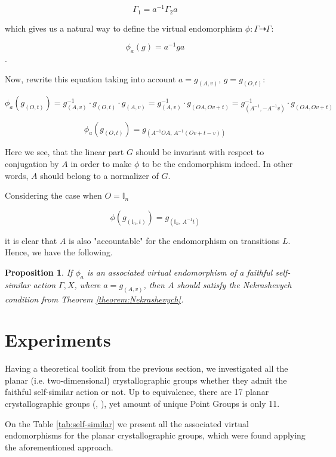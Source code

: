 \documentclass[a4paper,12pt]{amsart}
\newtheorem{proposition}{Proposition}
\begin{document}
	$$\Gamma_1 = a^{-1} \Gamma_2 a$$
	
	which gives us a natural way to define the virtual endomorphism $\phi : \Gamma \dashrightarrow \Gamma$: 
	
	$$\phi_a(g) = a^{-1} g a$$.
	
	Now, rewrite this equation taking into account $a = g_{(A, v)}, \, g = g_{(O, t)}$:
	
	$$\phi_a (g_{(O, t)}) = g^{-1}_{(A, v)} \cdot g_{(O, t)} \cdot g_{(A, v)} = g^{-1}_{(A, v)} \cdot g_{(OA, Ov + t)} = g^{-1}_{(A^{-1}, -A^{-1}v)} \cdot g_{(OA, Ov + t)} $$
	
	\begin{equation}
		\label{eq:eq1}
		\phi_a (g_{(O, t)}) = g_{(A^{-1}OA, \, A^{-1}(Ov + t - v))}
	\end{equation}
	
	Here we see, that the linear part $G$ should be invariant with respect to conjugation by $A$ in order to make $\phi$ to be the endomorphism indeed. In other words, $A$ should belong to a normalizer of $G$.
	
	Considering the case when $O = \mathbb{I}_n$
	
	\begin{equation}
		\label{eq:eq1}
		\phi (g_{(\mathbb{I}_n, t)}) = g_{(\mathbb{I}_n, \, A^{-1}t)}
	\end{equation}
		
	
	it is clear that $A$ is also "accountable" for the endomorphism on transitions $L$. Hence, we have the following.
	
	\begin{proposition}
		If $\phi_{a}$ is an associated virtual endomorphism of a faithful self-similar action $\Gamma, X$, where $a = g_{(A, v)}$, then $A$ should satisfy the Nekrashevych condition from Theorem \ref{theorem:Nekrashevych}.
	\end{proposition}
	
	
	\newpage 
	\section{Experiments}
	Having a theoretical toolkit from the previous section, we investigated all the planar (i.e. two-dimensional) crystallographic groups whether they admit the faithful self-similar action or not. Up to equivalence, there are 17 planar crystallographic groups (\cite{Fedorov}, \cite{Schoenflies}), yet amount of unique Point Groups is only 11.
	
	On the Table \ref{tab:self-similar} we present all the associated virtual endomorphisms for the planar crystallographic groups, which were found applying the aforementioned approach. 
	
\end{document}
